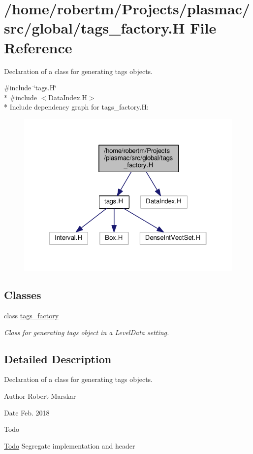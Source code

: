 \hypertarget{tags__factory_8H}{}\section{/home/robertm/\+Projects/plasmac/src/global/tags\+\_\+factory.H File Reference}
\label{tags__factory_8H}


Declaration of a class for generating tags objects.  


{\ttfamily \#include \char`\"{}tags.\+H\char`\"{}}\\*
{\ttfamily \#include $<$Data\+Index.\+H$>$}\\*
Include dependency graph for tags\+\_\+factory.\+H\+:\nopagebreak
\begin{figure}[H]
\begin{center}
\leavevmode
\includegraphics[width=322pt]{tags__factory_8H__incl}
\end{center}
\end{figure}
\subsection*{Classes}
\begin{DoxyCompactItemize}
\item 
class \hyperlink{classtags__factory}{tags\+\_\+factory}
\begin{DoxyCompactList}\small\item\em Class for generating tags object in a Level\+Data setting. \end{DoxyCompactList}\end{DoxyCompactItemize}


\subsection{Detailed Description}
Declaration of a class for generating tags objects. 

\begin{DoxyAuthor}{Author}
Robert Marskar 
\end{DoxyAuthor}
\begin{DoxyDate}{Date}
Feb. 2018 
\end{DoxyDate}
\begin{DoxyRefDesc}{Todo}
\item[\hyperlink{todo__todo000009}{Todo}]Segregate implementation and header \end{DoxyRefDesc}
